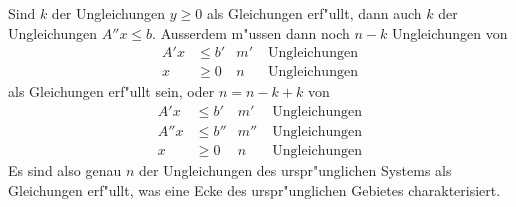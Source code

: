 Sind $k$ der Ungleichungen $y\ge 0$ als Gleichungen erf"ullt,
dann auch $k$ der Ungleichungen $A''x\le b$. Ausserdem
m"ussen dann noch $n-k$ Ungleichungen von
\begin{align*}
A'x&\le b' & m'&\;\text{Ungleichungen}\\
x  &\ge 0  &  n&\;\text{Ungleichungen}
\end{align*}
als Gleichungen erf"ullt sein, oder $n=n-k+k$ von
\begin{align*}
 A'x&\le b' & m'&\;\text{Ungleichungen}\\
A''x&\le b''&m''&\;\text{Ungleichungen}\\
 x  &\ge 0  &  n&\;\text{Ungleichungen}
\end{align*}
Es sind also genau $n$ der Ungleichungen des urspr"unglichen Systems
als Gleichungen erf"ullt, was eine Ecke des urspr"unglichen Gebietes
charakterisiert.

